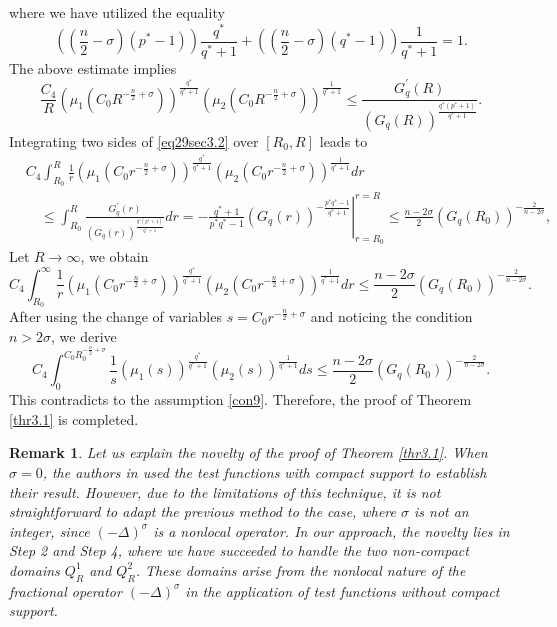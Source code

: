 \documentclass[11pt,reqno]{amsart}
\newcommand{\tron}[1]{\left( #1 \right)}
\numberwithin{equation}{section}
\newtheorem{remark}{Remark}[section]
\theoremstyle{plain}
\begin{document}
where we have utilized the equality
\[
\tron{\tron{\frac{n}{2}-\sigma}(p^*-1)}\frac{q^*}{q^*+1}+\tron{\tron{\frac{n}{2}-\sigma}(q^*-1)}\frac{1}{q^*+1}=1.
\]
The above estimate implies
\begin{equation}\label{eq29sec3.2}
\frac{C_4}{R}\left(\mu_1\left(C_0 R^{-\frac{n}{2}+\sigma}\right)\right)^{\frac{q^*}{q^*+1}}\left(\mu_2\left(C_0 R^{-\frac{n}{2}+\sigma}\right)\right)^{\frac{1}{q^*+1}} \leq \frac{G_q^{\prime}(R)}{\left(G_q(R)\right)^{\frac{q^*\left(p^*+1\right)}{q^*+1}}} .
\end{equation}
Integrating two sides of \eqref{eq29sec3.2} over $[R_0,R]$ leads to
\[
\begin{aligned}
& C_4 \int_{R_0}^{R} \frac{1}{r}\left(\mu_1\left(C_0 r^{-\frac{n}{2}+\sigma}\right)\right)^{\frac{q^*}{q^*+1}}\left(\mu_2\left(C_0 r^{-\frac{n}{2}+\sigma}\right)\right)^{\frac{1}{q^*+1}} d r \\
& \quad \leq \int_{R_0}^{R} \frac{G_q^{\prime}(r)}{\left(G_q(r)\right)^{\frac{q^*\left(p^*+1\right)}{q^*+1}}} d r =-\left.\frac{q^*+1}{p^* q^*-1}\left(G_q(r)\right)^{-\frac{p^*q^*-1}{q^*+1}}\right|_{r=R_0} ^{r=R} \leq \frac{n-2\sigma}{2}\left(G_q\left(R_0\right)\right)^{-\frac{2}{n-2\sigma}},
\end{aligned}
\]
Let $R\to \infty$, we obtain
\[
C_4 \int_{R_0}^{\infty} \frac{1}{r}\left(\mu_1\left(C_0 r^{-\frac{n}{2}+\sigma}\right)\right)^{\frac{q^*}{q^*+1}}\left(\mu_2\left(C_0 r^{-\frac{n}{2}+\sigma}\right)\right)^{\frac{1}{q^*+1}} d r\leq \frac{n-2\sigma}{2}\left(G_q\left(R_0\right)\right)^{-\frac{2}{n-2\sigma}}.
\]
After using the change of variables $s=C_0 r^{-\frac{n}{2}+\sigma}$ and noticing the condition $n>2\sigma$, we derive
$$
C_4 \int_0^{C_0 R_0^{-\frac{n}{2}+\sigma}}\frac{1}{s}\left(\mu_1(s)\right)^{\frac{q^*}{q^*+1}}\left(\mu_2(s)\right)^{\frac{1}{q^*+1}} d s \leq \frac{n-2\sigma}{2}\left(G_q\left(R_0\right)\right)^{-\frac{2}{n-2\sigma}}.
$$
This contradicts to the assumption \eqref{con9}. Therefore, the proof of Theorem \ref{thr3.1} is completed.
\begin{remark} \label{Remark*}
{\rm
Let us explain the novelty of the proof of Theorem \ref{thr3.1}. When $\sigma=0$, the authors in \cite{AnhRei2021} used the test functions with compact support to establish their result. However, due to the limitations of this technique, it is not straightforward to adapt the previous method to the case, where $\sigma$ is not an integer, since $(-\Delta)^{\sigma}$ is a nonlocal operator. In our approach, the novelty lies in Step 2 and Step 4, where we have succeeded to handle the two non-compact domains $Q^1_R$ and $Q^2_R$. These domains arise from the nonlocal nature of the fractional operator $(-\Delta)^{\sigma}$ in the application of test functions without compact support.
}    
\end{remark}
\end{document}
